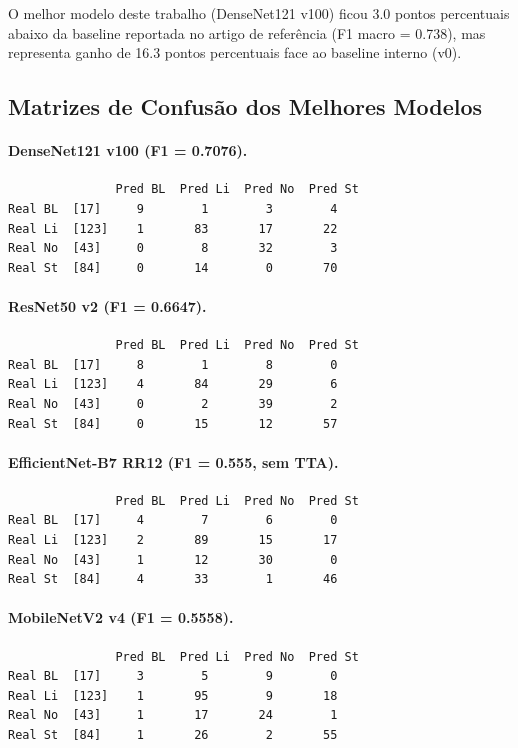 \documentclass[runningheads]{llncs}
\begin{document}
O melhor modelo deste trabalho (DenseNet121 v100) ficou 3.0 pontos percentuais
abaixo da baseline reportada no artigo de referência (F1 macro = 0.738), mas
representa ganho de 16.3 pontos percentuais face ao baseline interno (v0).

\subsection{Matrizes de Confusão dos Melhores Modelos}
\paragraph{DenseNet121 v100 (F1 = 0.7076).}
\begin{verbatim}
			   Pred BL  Pred Li  Pred No  Pred St
Real BL  [17]     9        1        3        4
Real Li  [123]    1       83       17       22
Real No  [43]     0        8       32        3
Real St  [84]     0       14        0       70
\end{verbatim}

\paragraph{ResNet50 v2 (F1 = 0.6647).}
\begin{verbatim}
			   Pred BL  Pred Li  Pred No  Pred St
Real BL  [17]     8        1        8        0
Real Li  [123]    4       84       29        6
Real No  [43]     0        2       39        2
Real St  [84]     0       15       12       57
\end{verbatim}

\paragraph{EfficientNet-B7 RR12 (F1 = 0.555, sem TTA).}
\begin{verbatim}
			   Pred BL  Pred Li  Pred No  Pred St
Real BL  [17]     4        7        6        0
Real Li  [123]    2       89       15       17
Real No  [43]     1       12       30        0
Real St  [84]     4       33        1       46
\end{verbatim}

\paragraph{MobileNetV2 v4 (F1 = 0.5558).}
\begin{verbatim}
			   Pred BL  Pred Li  Pred No  Pred St
Real BL  [17]     3        5        9        0
Real Li  [123]    1       95        9       18
Real No  [43]     1       17       24        1
Real St  [84]     1       26        2       55
\end{verbatim}
\end{document}
